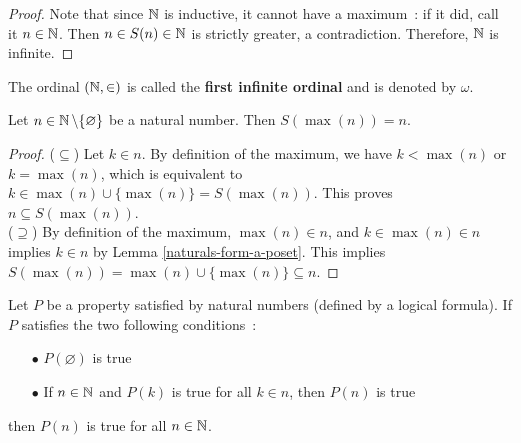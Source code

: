 \begin{proof}
    Note that since $\operatorname{\mathbb N}$ is inductive, it cannot have a maximum~: if it did, call it $n \in \operatorname{\mathbb N}$. Then $n \in S(n) \in \operatorname{\mathbb N}$ is strictly greater, a contradiction. Therefore, $\operatorname{\mathbb N}$ is infinite.
\end{proof}

\begin{definition} \label{first-infinite-ordinal}
    The ordinal $(\operatorname{\mathbb N},\in)$ is called the \textbf{first infinite ordinal} and is denoted by $\omega$. 
\end{definition}

\begin{lemma} \label{nonzero-naturals-have-predecessors}
    Let $n \in \operatorname{\mathbb N} \setminus \{\varnothing\}$ be a natural number. Then $S(\max{(n)}) = n$.
\end{lemma}

\begin{proof}
    ($\subseteq$) Let $k \in n$. By definition of the maximum, we have $k < \max{(n)}$ or $k = \max{(n)}$, which is equivalent to $k \in \max{(n)} \cup \{\max{(n)}\} = S(\max{(n)})$. This proves $n \subseteq S(\max{(n)})$.
    \\
    
    ($\supseteq$) By definition of the maximum, $\max{(n)} \in n$, and $k \in \max{(n)} \in n$ implies $k \in n$ by Lemma \autoref{naturals-form-a-poset}. This implies $S(\max{(n)}) = \max{(n)} \cup \{\max{(n)}\} \subseteq n$.
\end{proof}

\begin{corollary} \label{strong-induction-on-natural-numbers}
    Let $P$ be a property satisfied by natural numbers (defined by a logical formula). If $P$ satisfies the two following conditions~:
    \\

    \begin{itemize}
        \item[$\bullet$] $P(\varnothing)$ is true
        \\

        \item[$\bullet$] If $n \in \operatorname{\mathbb N}$ and $P(k)$ is true for all $k \in n$, then $P(n)$ is true
        \\
        
    \end{itemize}
    then $P(n)$ is true for all $n \in \operatorname{\mathbb N}$.
\end{corollary}

